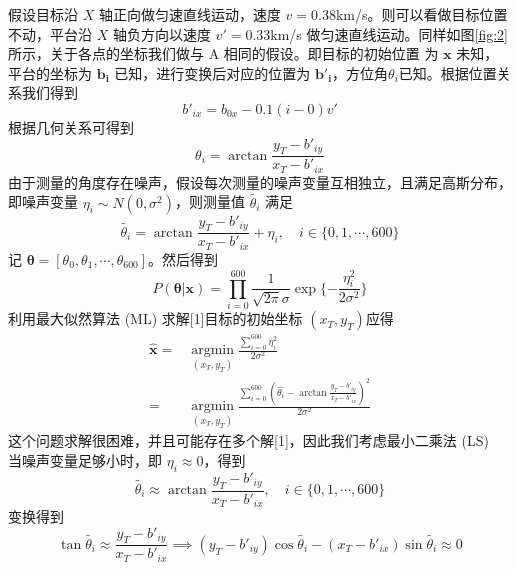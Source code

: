\documentclass[UTF8]{ctexart}
\begin{document}
假设目标沿 $X$ 轴正向做匀速直线运动，速度 $v=0.38$km/s。则可以看做目标位置不动，平台沿 $X$ 轴负方向以速度 $v'=0.33$km/s 做匀速直线运动。同样如图\ref{fig:2}所示，关于各点的坐标我们做与 A 相同的假设。即目标的初始位置
为 $\bm{x}$ 未知，平台的坐标为 $\bm{b_i}$ 已知，进行变换后对应的位置为 $\bm{b'_i}$，方位角$\theta_i$已知。根据位置关系我们得到
\begin{equation}
    b'_{ix} = b_{0x} - 0.1(i-0)v'
\end{equation}
根据几何关系可得到
\begin{equation}
    \theta_i = \arctan \frac{y_T-b'_{iy}}{x_T-b'_{ix}}
\end{equation}
由于测量的角度存在噪声，假设每次测量的噪声变量互相独立，且满足高斯分布，即噪声变量 $\eta_i \sim N(0,\sigma^2)$，则测量值 $\tilde{\theta_i}$ 满足
\begin{equation}
    \tilde{\theta_i} = \arctan \frac{y_T-b'_{iy}}{x_T-b'_{ix}} + \eta_i, \quad i \in \lbrace 0,1,\cdots,600 \rbrace
\end{equation}
记 $\bm{\theta} = [\theta_0, \theta_1, \cdots, \theta_{600}]$。然后得到
\begin{equation}
    P(\bm{\theta} | \bm{x}) = \prod\limits_{i = 0}^{600} {\frac{1}{{\sqrt {2\pi } \sigma }}\exp \{  - \frac{{\eta _i^2}}{{2{\sigma ^2}}}\} } 
\end{equation}
利用最大似然算法 (ML) 求解[1]目标的初始坐标 $(x_T, y_T)$应得
\begin{equation}
    \begin{split}
        \hat{\bm{x}} =& \mathop {\arg \min }\limits_{({x_T},{y_T})} \frac{\sum\limits_{i=0}^{600} \eta_i^2}{2 \sigma^2} \\
                    =& \mathop {\arg \min}\limits_{(x_T,y_T)} \frac{\sum\limits_{i=0}^{600} (\hat{\theta_i}-\arctan\frac{y_T-b'_{iy}}{x_T-b'_{ix}})^2}{2\sigma^2}
    \end{split}
\end{equation}
这个问题求解很困难，并且可能存在多个解[1]，因此我们考虑最小二乘法 (LS)\\
当噪声变量足够小时，即 $\eta_i \approx 0$，得到
\begin{equation}
    \tilde{\theta_i} \approx \arctan \frac{y_T-b'_{iy}}{x_T-b'_{ix}} , \quad i \in \lbrace 0,1,\cdots,600 \rbrace
\end{equation}
变换得到
\begin{equation}
    \tan \tilde{\theta_i} \approx \frac{y_T-b'_{iy}}{x_T-b'_{ix}} \implies (y_T-b'_{iy})\cos \tilde{\theta_i} - (x_T-b'_{ix})\sin \tilde{\theta_i} \approx 0
\end{equation}
\end{document}
